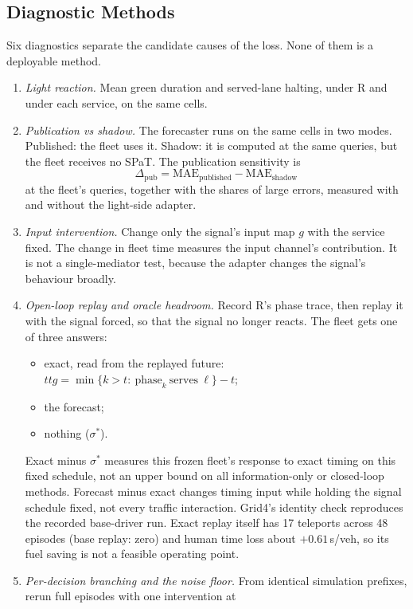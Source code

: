 \subsection{Diagnostic Methods}\label{sec:diagmethods}
Six diagnostics separate the candidate causes of the loss. None of them is a deployable method.
\begin{enumerate}\setlength\itemsep{1pt}
\item \emph{Light reaction.} Mean green duration and served-lane halting, under R and under each service, on the same cells.
\item \emph{Publication vs shadow.} The forecaster runs on the same cells in two modes. Published: the fleet uses it. Shadow: it is
computed at the same queries, but the fleet receives no SPaT. The publication sensitivity is
\begin{equation}
\Delta_{\mathrm{pub}}=\mathrm{MAE}_{\mathrm{published}}-\mathrm{MAE}_{\mathrm{shadow}}
\end{equation}
at the fleet's queries, together with the shares of large errors, measured with and without the light-side adapter.
\item \emph{Input intervention.} Change only the signal's input map $g$ with the service fixed. The change in fleet time measures the
input channel's contribution. It is not a single-mediator test, because the adapter changes the signal's behaviour broadly.
\item \emph{Open-loop replay and oracle headroom.} Record R's phase trace, then replay it with the signal forced, so that the signal no
longer reacts. The fleet gets one of three answers:
\begin{itemize}\setlength\itemsep{0pt}
\item exact, read from the replayed future: $\mathit{ttg}=\min\{k>t:\ \text{phase}_k\ \text{serves}\ \ell\}-t$;
\item the forecast;
\item nothing ($\sigma^*$).
\end{itemize}
Exact minus $\sigma^*$ measures this frozen fleet's response to exact timing on this fixed schedule, not an upper bound on all information-only or closed-loop methods. Forecast minus exact changes timing input while holding the signal schedule fixed, not every traffic interaction. Grid4's identity check reproduces the recorded base-driver run. Exact replay itself has 17 teleports across 48 episodes (base replay: zero) and human time loss about $+0.61$\,s/veh, so its fuel saving is not a feasible operating point.
\item \emph{Per-decision branching and the noise floor.} From identical simulation prefixes, rerun full episodes with one intervention at

\end{enumerate}
